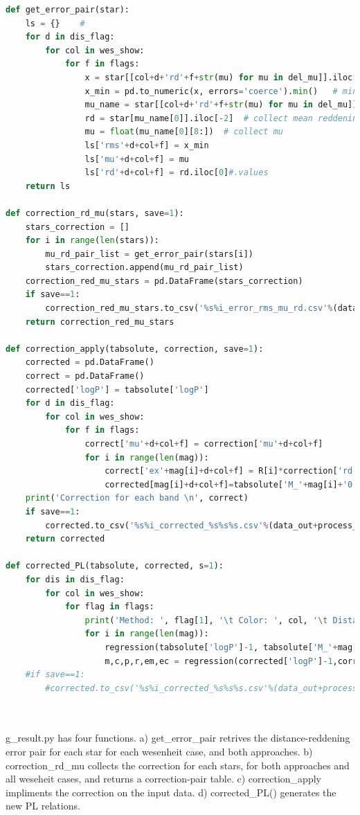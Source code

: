 \documentclass{article}
\begin{document}
\begin{lstlisting}[language=Python, caption=dependencies for main.py]
def get_error_pair(star):
    ls = {}    # 
    for d in dis_flag:
        for col in wes_show: 
            for f in flags:
                x = star[[col+d+'rd'+f+str(mu) for mu in del_mu]].iloc[-1]# # variance list
                x_min = pd.to_numeric(x, errors='coerce').min()   # minimum variance
                mu_name = star[[col+d+'rd'+f+str(mu) for mu in del_mu]].iloc[-1].idxmin()  # collect mu index
                rd = star[mu_name[0]].iloc[-2]  # collect mean reddening 
                mu = float(mu_name[0][8:])  # collect mu
                ls['rms'+d+col+f] = x_min 
                ls['mu'+d+col+f] = mu
                ls['rd'+d+col+f] = rd.iloc[0]#.values 
    return ls

def correction_rd_mu(stars, save=1):
    stars_correction = [] 
    for i in range(len(stars)):
        mu_rd_pair_list = get_error_pair(stars[i])
        stars_correction.append(mu_rd_pair_list)
    correction_red_mu_stars = pd.DataFrame(stars_correction)
    if save==1:
        correction_red_mu_stars.to_csv('%s%i_error_rms_mu_rd.csv'%(data_out+process_step[6],len(stars)))
    return correction_red_mu_stars    

def correction_apply(tabsolute, correction, save=1):
    corrected = pd.DataFrame()
    correct = pd.DataFrame()
    corrected['logP'] = tabsolute['logP'] 
    for d in dis_flag:
        for col in wes_show:
            for f in flags:
                correct['mu'+d+col+f] = correction['mu'+d+col+f]
                for i in range(len(mag)):
                    correct['ex'+mag[i]+d+col+f] = R[i]*correction['rd'+d+col+f]
                    corrected[mag[i]+d+col+f]=tabsolute['M_'+mag[i]+'0'+d] + correct['ex'+mag[i]+d+col+f]+correction['mu'+d+col+f]
    print('Correction for each band \n', correct)
    if save==1:
        corrected.to_csv('%s%i_corrected_%s%s%s.csv'%(data_out+process_step[7],len(corrected), d, col, f))
    return corrected
    
def corrected_PL(tabsolute, corrected, s=1):
    for dis in dis_flag:
        for col in wes_show:
            for flag in flags:
                print('Method: ', flag[1], '\t Color: ', col, '\t Distance: ', dis[1])
                for i in range(len(mag)):
                    regression(tabsolute['logP']-1, tabsolute['M_'+mag[i]+'0'+dis], '(logP - 1)', 'M__'+mag[i], 1)
                    m,c,p,r,em,ec = regression(corrected['logP']-1,corrected[mag[i]+dis+col+flag], '(logP - 1)', 'M*_%s'%(mag[i]), p = s)
    #if save==1:
        #corrected.to_csv('%s%i_corrected_%s%s%s.csv'%(data_out+process_step[6],len(corrected),col, dis, flag))
        
        
\end{lstlisting}

g\_result.py has four functions. a) get\_error\_pair retrives the distance-reddening error pair for each star for each wesenheit case, and both approaches. b) correction\_rd\_mu collects the correction for each stars, for both approaches and all weseheit cases, and returns a correction-pair table. c) correction\_apply impliments the correction on the input data. d) corrected\_PL() generates the new PL relations. 
\end{document}
